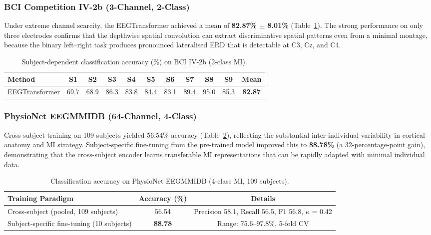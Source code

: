 \documentclass[12pt, a4paper]{article}
\begin{document}
\subsubsection{BCI Competition IV-2b (3-Channel, 2-Class)}

Under extreme channel scarcity, the EEGTransformer achieved a mean of \textbf{82.87\% $\pm$ 8.01\%} (Table~\ref{tab:iv2b_results}). The strong performance on only three electrodes confirms that the depthwise spatial convolution can extract discriminative spatial patterns even from a minimal montage, because the binary left--right task produces pronounced lateralised ERD that is detectable at C3, Cz, and C4.

\begin{table}[htbp]
\centering
\caption{Subject-dependent classification accuracy (\%) on BCI IV-2b (2-class MI).}
\label{tab:iv2b_results}
\begin{tabular}{lcccccccccc}
\toprule
\textbf{Method} & \textbf{S1} & \textbf{S2} & \textbf{S3} & \textbf{S4} & \textbf{S5} & \textbf{S6} & \textbf{S7} & \textbf{S8} & \textbf{S9} & \textbf{Mean} \\
\midrule
EEGTransformer & 69.7 & 68.9 & 86.3 & 83.8 & 84.4 & 83.1 & 89.4 & 95.0 & 85.3 & \textbf{82.87} \\
\bottomrule
\end{tabular}
\end{table}

\subsubsection{PhysioNet EEGMMIDB (64-Channel, 4-Class)}

Cross-subject training on 109 subjects yielded 56.54\% accuracy (Table~\ref{tab:physionet_results}), reflecting the substantial inter-individual variability in cortical anatomy and MI strategy. Subject-specific fine-tuning from the pre-trained model improved this to \textbf{88.78\%} (a 32-percentage-point gain), demonstrating that the cross-subject encoder learns transferable MI representations that can be rapidly adapted with minimal individual data.

\begin{table}[htbp]
\centering
\caption{Classification accuracy on PhysioNet EEGMMIDB (4-class MI, 109 subjects).}
\label{tab:physionet_results}
\begin{tabular}{lcc}
\toprule
\textbf{Training Paradigm} & \textbf{Accuracy (\%)} & \textbf{Details} \\
\midrule
Cross-subject (pooled, 109 subjects) & 56.54 & Precision 58.1, Recall 56.5, F1 56.8, $\kappa$ = 0.42 \\
Subject-specific fine-tuning (10 subjects) & \textbf{88.78} & Range: 75.6--97.8\%, 5-fold CV \\
\bottomrule
\end{tabular}
\end{table}
\end{document}
